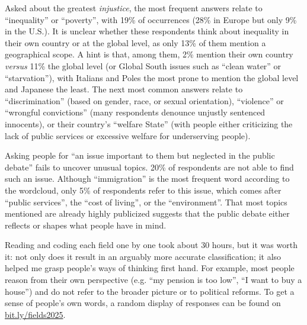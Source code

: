 \documentclass[12pt,english]{article}
\begin{document}
\begin{bibunit}
Asked about the greatest \textit{injustice}, the most frequent answers relate to ``inequality'' or ``poverty'', with 19\% of occurrences (28\% in Europe but only 9\% in the U.S.). It is unclear whether these respondents think about inequality in their own country or at the global level, as only 13\% of them mention a geographical scope. A hint is that, among them, 2\% mention their own country \textit{versus} 11\% the global level (or Global South issues such as ``clean water'' or ``starvation''), with Italians and Poles the most prone to mention the global level and Japanese the least. The next most common answers relate to ``discrimination'' (based on gender, race, or sexual orientation), ``violence'' or ``wrongful convictions'' (many respondents denounce unjustly sentenced innocents), or their country's ``welfare State'' (with people either criticizing the lack of public services or excessive welfare for underserving people). 

Asking people for ``an issue important to them but neglected in the public debate'' fails to uncover unusual topics. 20\% of respondents are not able to find such an issue. Although ``immigration'' is the most frequent word according to the wordcloud, only 5\% of respondents refer to this issue, which comes after ``public services'', the ``cost of living'', or the ``environment''. That most topics mentioned are already highly publicized suggests that the public debate either reflects or shapes what people have in mind. %

Reading and coding each field one by one took about 30 hours, but it was worth it: not only does it result in an arguably more accurate classification; it also helped me grasp people's ways of thinking first hand. For example, most people reason from their own perspective (e.g. ``my pension is too low'', ``I want to buy a house'') and do not refer to the broader picture or to political reforms. To get a sense of people's own words, a random display of responses can be found on \href{http://preferences-pol.fr/fields2025.html}{bit.ly/fields2025}.


\end{bibunit}
\end{document}
